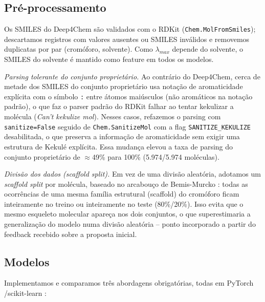 \documentclass[12pt]{article}
\begin{document}
\subsection{Pré-processamento}

Os SMILES do Deep4Chem são validados com o RDKit \cite{rdkit2024} (\texttt{Chem.MolFromSmiles}); descartamos registros com valores ausentes ou SMILES inválidos e removemos duplicatas por par (cromóforo, solvente). Como $\lambda_{max}$ depende do solvente, o SMILES do solvente é mantido como feature em todos os modelos.

\textit{Parsing tolerante do conjunto proprietário.} Ao contrário do Deep4Chem, cerca de metade dos SMILES do conjunto proprietário usa notação de aromaticidade explícita com o símbolo \texttt{:} entre átomos maiúsculos (não aromáticos na notação padrão), o que faz o parser padrão do RDKit falhar ao tentar kekulizar a molécula (\textit{Can't kekulize mol}). Nesses casos, refazemos o parsing com \texttt{sanitize=False} seguido de \texttt{Chem.SanitizeMol} com a flag \texttt{SANITIZE\_KEKULIZE} desabilitada, o que preserva a informação de aromaticidade sem exigir uma estrutura de Kekulé explícita. Essa mudança elevou a taxa de parsing do conjunto proprietário de $\approx$49\% para 100\% (5.974/5.974 moléculas).

\textit{Divisão dos dados (scaffold split).} Em vez de uma divisão aleatória, adotamos um \textit{scaffold split} por molécula, baseado no arcabouço de Bemis-Murcko \cite{bemis1996}: todas as ocorrências de uma mesma família estrutural (scaffold) do cromóforo ficam inteiramente no treino ou inteiramente no teste (80\%/20\%). Isso evita que o mesmo esqueleto molecular apareça nos dois conjuntos, o que superestimaria a generalização do modelo numa divisão aleatória -- ponto incorporado a partir do feedback recebido sobre a proposta inicial.

\subsection{Modelos}

Implementamos e comparamos três abordagens obrigatórias, todas em PyTorch \cite{paszke2019}/scikit-learn \cite{pedregosa2011}:
\end{document}
